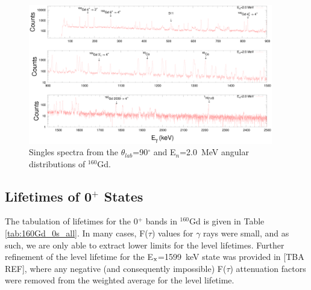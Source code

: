 \begin{figure}[h!]
\begin{center}
\includegraphics[width=0.95\textwidth]{figures/160Gd_200_spectra.eps}
\caption{Singles spectra from the $\theta_{lab}$=90$^\circ$ and E$_n$=2.0~MeV angular distributions of $^{160}$Gd. \label{fig:160Gd_200_spectrum}}
\end{center}
\end{figure}

\subsection{Lifetimes of 0$^+$ States}
The tabulation of lifetimes for the 0$^+$ bands in $^{160}$Gd is given in Table \ref{tab:160Gd_0s_all}. In many cases, F($\tau$) values for $\gamma$ rays were small, and as such, we are only able to extract lower limits for the level lifetimes. Further refinement of the level lifetime for the E$_{\rm x}$=1599~keV state was provided in [TBA REF], where any negative (and consequently impossible) F($\tau$) attenuation factors were removed from the weighted average for the level lifetime.

